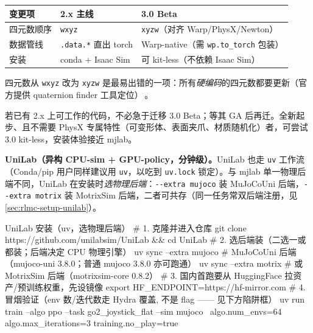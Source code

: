 \begin{center}
\small
\begin{tabular}{@{}lll@{}}
\toprule
变更项 & 2.x 主线 & 3.0 Beta \\
\midrule
四元数顺序 & \texttt{wxyz} & \texttt{xyzw}（对齐 Warp/PhysX/Newton） \\
数据管线 & \texttt{.data.*} 直出 torch & Warp-native（需 \texttt{wp.to\_torch} 包装） \\
安装 & conda + Isaac Sim & 可 kit-less（不依赖 Isaac Sim） \\
\bottomrule
\end{tabular}
\end{center}

四元数从 \verb|wxyz| 改为 \verb|xyzw| 是最易出错的一项：所有\emph{硬编码}的四元数都要更新（官方提供 quaternion finder 工具定位）\,\cite{isaaclab2024}。

\begin{note}[工程建议]
若已有 2.x 上可工作的代码，不必急于迁移 3.0 Beta；等其 GA 后再迁。全新起步、且不需要 PhysX 专属特性（可变形体、表面夹爪、材质随机化）者，可尝试 3.0 kit-less，安装体验接近 mjlab。
\end{note}

\textbf{UniLab（异构 CPU-sim + GPU-policy，分钟级）。}UniLab 也走 \verb|uv| 工作流（Conda/pip 用户同样建议用 \verb|uv|，以吃到 \verb|uv.lock| 锁定）。与 mjlab 单一物理后端不同，UniLab 在安装时\emph{选物理后端}：\verb|--extra mujoco| 装 MuJoCoUni 后端，\verb|--extra motrix| 装 MotrixSim 后端，二者可共存（同一任务常双后端注册，见 \cref{sec:rlmc-setup-unilab}）。

\begin{codebox}[bash]{UniLab 安装（uv，选物理后端）}
# 1. 克隆并进入仓库
git clone https://github.com/unilabsim/UniLab && cd UniLab
# 2. 选后端装（二选一或都装；后端决定 CPU 物理引擎）
uv sync --extra mujoco          # MuJoCoUni 后端（mujoco-uni 3.8.0；普通 mujoco 3.8.0 亦可跑通）
uv sync --extra motrix          # 或 MotrixSim 后端（motrixsim-core 0.8.2）
# 3. 国内首跑要从 HuggingFace 拉资产/预训练权重，先设镜像
export HF_ENDPOINT=https://hf-mirror.com
# 4. 冒烟验证（env 数/迭代数走 Hydra 覆盖, 不是 flag —— 见下方陷阱框）
uv run train --algo ppo --task go2_joystick_flat --sim mujoco \
    algo.num_envs=64 algo.max_iterations=3 training.no_play=true
\end{codebox}

